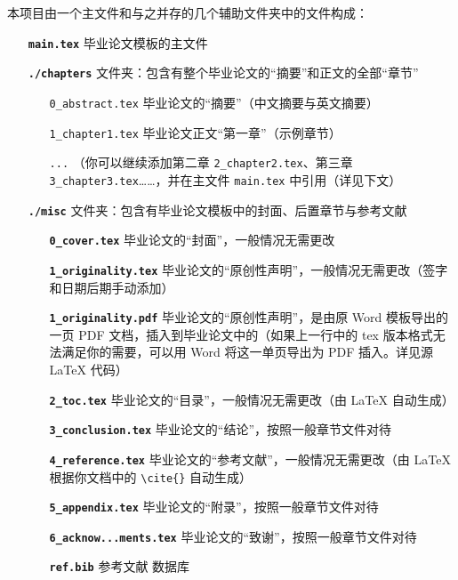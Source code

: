 本项目由一个主文件和与之并存的几个辅助文件夹中的文件构成：

\begin{itemize}
  \item[\color{RubineRed}\textbf{\texttt{main.tex}}] 毕业论文模板的主文件
  \item[\color{RubineRed}\textbf{\texttt{./chapters}}] 文件夹：包含有整个毕业论文的“摘要”和正文的全部“章节”
        \begin{itemize}
          \item[\color{RoyalBlue}\texttt{0\_abstract.tex}] 毕业论文的“摘要”（中文摘要与英文摘要）
          \item[\color{RoyalBlue}\texttt{1\_chapter1.tex}] 毕业论文正文“第一章”（示例章节）
          \item[\color{RoyalBlue}\texttt{...}] （你可以继续添加第二章 \texttt{2\_chapter2.tex}、第三章 \texttt{3\_chapter3.tex}……，并在主文件 \texttt{main.tex} 中引用（详见下文）
        \end{itemize}
  \item[\color{RubineRed}\textbf{\texttt{./misc}}] 文件夹：包含有毕业论文模板中的封面、后置章节与参考文献
        \begin{itemize}
          \item[\color{RoyalBlue}\textbf{\texttt{0\_cover.tex}}] 毕业论文的“封面”，一般情况无需更改
          \item[\color{RoyalBlue}\textbf{\texttt{1\_originality.tex}}] 毕业论文的“原创性声明”，一般情况无需更改（签字和日期后期手动添加）
          \item[\color{RoyalBlue}\textbf{\texttt{1\_originality.pdf}}] 毕业论文的“原创性声明”，是由原 Word 模板导出的一页 PDF 文档，插入到毕业论文中的（如果上一行中的 tex 版本格式无法满足你的需要，可以用 Word 将这一单页导出为 PDF 插入。详见源 LaTeX 代码）
          \item[\color{RoyalBlue}\textbf{\texttt{2\_toc.tex}}] 毕业论文的“目录”，一般情况无需更改（由 {\LaTeX} 自动生成）
          \item[\color{RoyalBlue}\textbf{\texttt{3\_conclusion.tex}}] 毕业论文的“结论”，按照一般章节文件对待
          \item[\color{RoyalBlue}\textbf{\texttt{4\_reference.tex}}] 毕业论文的“参考文献”，一般情况无需更改（由 {\LaTeX} 根据你文档中的 \verb|\cite{}| 自动生成）
          \item[\color{RoyalBlue}\textbf{\texttt{5\_appendix.tex}}] 毕业论文的“附录”，按照一般章节文件对待
          \item[\color{RoyalBlue}\textbf{\texttt{6\_acknow...ments.tex}}] 毕业论文的“致谢”，按照一般章节文件对待
          \item[\color{RoyalBlue}\textbf{\texttt{ref.bib}}] 参考文献  数据库
        \end{itemize}
\end{itemize}

